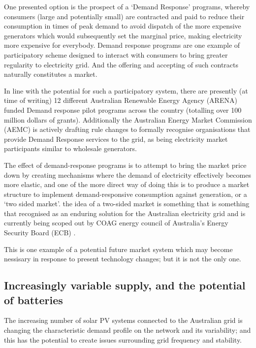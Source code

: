One presented option is the prospect of a `Demand Response' programs, whereby consumers (large and potentially small) are contracted and paid to reduce their consumption in times of peak demand to avoid dispatch of the more expensive generators which would subsequently set the marginal price, making electricity more expensive for everybody.
Demand response programs are one example of participatory scheme designed to interact with consumers to bring greater regularity to electricity grid. And the offering and accepting of such contracts naturally constitutes a market.

In line with the potential for such a participatory system, there are presently (at time of writing) 12 different Australian Renewable Energy Agency (ARENA) funded Demand response pilot programs across the country (totalling over 100 million dollars of grants).
Additionally the Australian Energy Market Commission (AEMC) is actively drafting rule changes to formally recognise organisations that provide Demand Response services to the grid, as being electricity market participants similar to wholesale generators.\cite{australianenergymarketcommission2020}

The effect of demand-response programs is to attempt to bring the market price down by creating mechanisms where the demand of electricity effectively becomes more elastic, and one of the more direct way of doing this is to produce a market structure to implement demand-responsive consumption against generation, or a `two sided market'.
the idea of a two-sided market is something that is something that recognised as an enduring solution for the Australian electricity grid \cite{australianenergymarketcommission2020} and is currently being scoped out by COAG energy council of Australia's Energy Security Board (ECB) \cite{energysecurityboard2020}.

This is one example of a potential future market system which may become nessisary in response to present technology changes; but it is not the only one.

\subsection{Increasingly variable supply, and the potential of batteries}

The increasing number of solar PV systems connected to the Australian grid is changing the characteristic demand profile on the network and its variability; and this has the potential to create issues surrounding grid frequency and stability.

